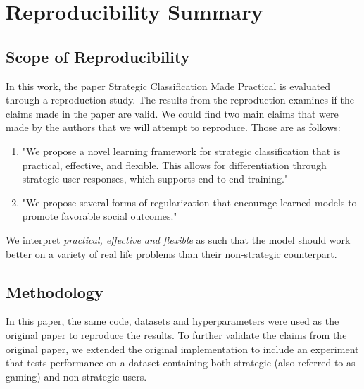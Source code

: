 \maketitle

\section*{\centering Reproducibility Summary}


\subsection*{Scope of Reproducibility}

In this work, the paper Strategic Classification Made Practical\cite{levanon2021strategic} is evaluated through a reproduction study. The results from the reproduction examines if the claims made in the paper are valid. We could find two main claims that were made by the authors that we will attempt to reproduce. Those are as follows:

\begin{enumerate}
    \item "We propose a novel learning framework for strategic classification that is practical, effective, and flexible. This allows for differentiation through strategic user responses, which supports end-to-end training."
    \item "We propose several forms of regularization that encourage learned models to promote favorable social outcomes."
\end{enumerate}

We interpret \textit{practical, effective and flexible} as such that the model should work better on a variety of real life problems than their non-strategic counterpart.

\subsection*{Methodology}

In this paper, the same code, datasets and hyperparameters were used as the original paper to reproduce the results.
To further validate the claims from the original paper, we extended the original implementation to include an experiment that tests performance on a dataset containing both strategic (also referred to as gaming) and non-strategic users.


